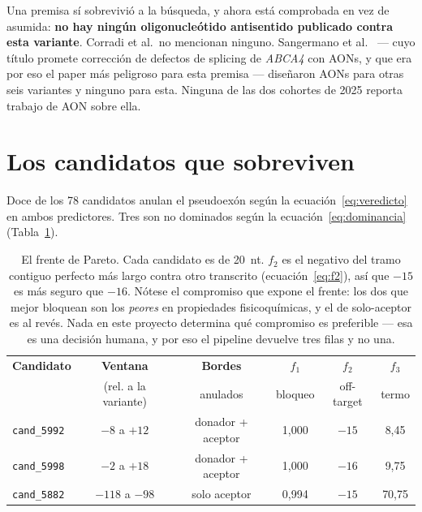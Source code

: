 \documentclass[11pt,a4paper]{article}
\begin{document}
Una premisa sí sobrevivió a la búsqueda, y ahora está comprobada en vez de asumida: \textbf{no hay
ningún oligonucleótido antisentido publicado contra esta variante}. Corradi et al.\ no mencionan
ninguno. Sangermano et al.~\cite{sangermano2019} --- cuyo título promete corrección de defectos de
splicing de \emph{ABCA4} con AONs, y que era por eso el paper más peligroso para esta premisa ---
diseñaron AONs para otras seis variantes y ninguno para esta. Ninguna de las dos cohortes de 2025
reporta trabajo de AON sobre ella.

\section{Los candidatos que sobreviven}
\label{sec:candidatos}

Doce de los 78 candidatos anulan el pseudoexón según la ecuación~\ref{eq:veredicto} en ambos
predictores. Tres son no dominados según la ecuación~\ref{eq:dominancia} (Tabla~\ref{tab:frente}).

\begin{table}[htbp]
\centering
\small
\begin{tabular}{@{}lccccc@{}}
\toprule
\textbf{Candidato} & \textbf{Ventana} & \textbf{Bordes} & $f_1$ & $f_2$ & $f_3$ \\
 & (rel. a la variante) & anulados & bloqueo & off-target & termo \\
\midrule
\texttt{cand\_5992} & $-8$ a $+12$    & donador + aceptor & 1,000 & $-15$ & \phantom{0}8,45 \\
\texttt{cand\_5998} & $-2$ a $+18$    & donador + aceptor & 1,000 & $-16$ & \phantom{0}9,75 \\
\texttt{cand\_5882} & $-118$ a $-98$  & solo aceptor      & 0,994 & $-15$ & 70,75 \\
\bottomrule
\end{tabular}
\caption{El frente de Pareto. Cada candidato es de 20~nt. $f_2$ es el negativo del tramo contiguo
perfecto más largo contra otro transcrito (ecuación~\ref{eq:f2}), así que $-15$ es más seguro que
$-16$. Nótese el compromiso que expone el frente: los dos que mejor bloquean son los \emph{peores}
en propiedades fisicoquímicas, y el de solo-aceptor es al revés. Nada en este proyecto determina qué
compromiso es preferible --- esa es una decisión humana, y por eso el pipeline devuelve tres filas y
no una.}
\label{tab:frente}
\end{table}
\end{document}
